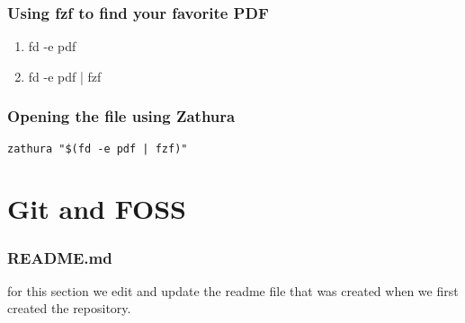 \documentclass[titlepage]{article}
\begin{document}
\subsubsection{Using fzf to find your favorite PDF}
\begin{enumerate}
\item fd -e pdf

\item fd -e pdf | fzf
\end{enumerate}

\subsubsection{Opening the file using Zathura}
\begin{verbatim}
zathura "$(fd -e pdf | fzf)"
\end{verbatim}

\section{Git and FOSS}
\subsubsection{README.md}
for this section we edit and update the readme file that was created when we first created the repository.
\end{document}
